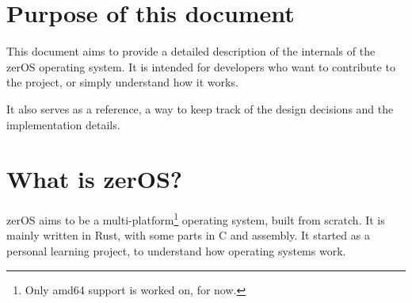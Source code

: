 \section{Purpose of this document}

This document aims to provide a detailed description of the internals of the zerOS operating system. It is intended for developers who want to contribute to the project, or simply understand how it works.

It also serves as a reference, a way to keep track of the design decisions and the implementation details.

\section{What is zerOS?}

zerOS aims to be a multi-platform\footnote{Only amd64 support is worked on, for now.} operating system, built from scratch. It is mainly written in Rust, with some parts in C and assembly. It started as a personal learning project, to understand how operating systems work.